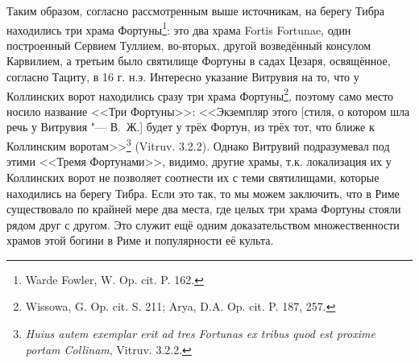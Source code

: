 Таким образом, согласно рассмотренным выше источникам, на берегу Тибра находились три храма Фортуны\footnote{Warde Fowler, W. Op. cit. P. 162.}: это два храма Fortis Fortunae, один построенный Сервием Туллием, во-вторых, другой возведённый консулом Карвилием, а третьим было святилище Фортуны в садах Цезаря, освящённое, согласно Тациту, в 16 г. н.э. Интересно указание Витрувия на то, что у Коллинских ворот находились сразу три храма Фортуны\footnote{Wissowa, G. Op. cit. S. 211; Arya, D.A. Op. cit. P. 187, 257.}, поэтому само место носило название <<Три Фортуны>>: <<Экземпляр этого [стиля, о котором шла речь у Витрувия "--- В.~Ж.] будет у трёх Фортун, из трёх тот, что ближе к Коллинским воротам>>\footnote{\textit{Huius autem exemplar erit ad tres Fortunas ex tribus quod est proxime portam Collinam}, Vitruv. 3.2.2.} (Vitruv. 3.2.2). Однако Витрувий подразумевал под этими <<Тремя Фортунами>>, видимо, другие храмы, т.к. локализация их у Коллинских ворот не позволяет соотнести их с теми святилищами, которые находились на берегу Тибра. Если это так, то мы можем заключить, что в Риме существовало по крайней мере два места, где целых три храма Фортуны стояли рядом друг с другом. Это служит ещё одним доказательством множественности храмов этой богини в Риме и популярности её культа.




